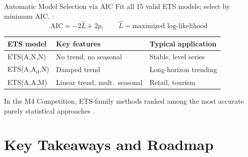 \documentclass[aspectratio=169, 11pt]{beamer}
\begin{document}
\begin{frame}{Automatic Model Selection via AIC}
  Fit all 15 valid ETS models; select by minimum AIC.
  \parencite[][Ch.~8]{Hyndman2021}:
  \[
    \mathrm{AIC} = -2\hat{L} + 2p,
    \qquad \hat{L} = \text{maximized log-likelihood}
  \]
  \begin{center}
    {\small
    \begin{tabular}{lll}
      \toprule
      \textbf{ETS model} & \textbf{Key features} & \textbf{Typical application} \\
      \midrule
      ETS(A,N,N) & No trend, no seasonal   & Stable, level series \\
      ETS(A,A\textsubscript{d},N) & Damped trend & Long-horizon trending \\
      ETS(A,A,M) & Linear trend, mult.\ seasonal & Retail, tourism \\
      \bottomrule
    \end{tabular}
    }
  \end{center}
  \begin{keybox}
    In the M4 Competition, ETS-family methods ranked among the most
    accurate purely statistical approaches \parencite{Makridakis2020}.
  \end{keybox}
\end{frame}

\section{Key Takeaways and Roadmap}

\end{document}
